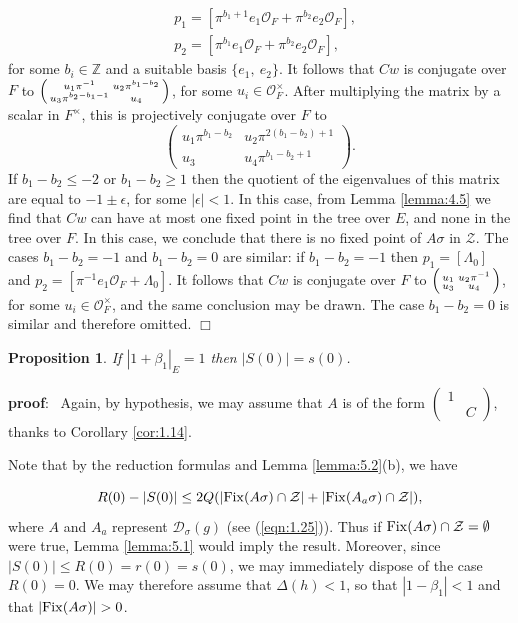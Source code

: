 \documentclass[12pt,letterpaper]{amsart}
\numberwithin{equation}{section}
\newtheorem{proposition}[theorem]{Proposition}
\theoremstyle{definition}
\theoremstyle{plain}
\providecommand{\cal}{\mathcal}
\def\ddd{{\cal D}}
\def\zz{{\cal Z}}
\def\zzz{\mathbb{Z}}
\def\pf{{\bf proof}:\ }
\def\qed{$\Box$}
\def\off{{\cal O}_F}
\begin{document}
\begin{equation}
\begin{split}
&p_1 = [\pi^{b_1+1}e_1\off + \pi^{b_2}e_2\off ],\\
&p_2 = [\pi^{b_1}e_1\off + \pi^{b_2}e_2\off ],
\end{split}
\label{eqn:5.5}
\end{equation}
for some $b_i\in\zzz$ and a suitable basis $\{e_1,\ e_2\}$. It follows that
$Cw$ is conjugate over $F$ to
$\left(\smallmatrix u_1\pi^{-1}&u_2\pi^{b_1-b_2}\\ u_3\pi^{b_2-b_1-1}&
u_4\endsmallmatrix\right)$,
for some $u_i\in \off^{\times}$. After multiplying the matrix by a
scalar in $F^\times$, this is projectively conjugate over $F$ to
\[
\begin{pmatrix}
u_1\pi^{b_1-b_2} &u_2\pi^{2(b_1-b_2)+1}\\
u_3&u_4\pi^{b_1-b_2+1}
\end{pmatrix}.
\]
If $b_1-b_2\leq -2$ or
$b_1-b_2\geq 1$ then the quotient of the eigenvalues
of this matrix are equal to $-1 \pm \epsilon$, for some
$|\epsilon |<1$. 
In this case, from Lemma \ref{lemma:4.5} we find that
$Cw$ can have at most one fixed point in the tree over $E$,
and none in the tree over $F$. In this case,
we conclude that
there is no fixed point of $A\sigma$ in $\zz$. The cases $b_1-b_2=-1$
and $b_1-b_2=0$ are similar: if $b_1-b_2=-1$ then $p_1=[\Lambda_0]$
and $p_2=[\pi^{-1}e_1\off +\Lambda_0]$. It follows that
$Cw$ is conjugate over $F$ to
$\left(\smallmatrix u_1&u_2\pi^{-1}\\ u_3&u_4\endsmallmatrix\right)$,
for some $u_i\in \off^{\times}$, and the same conclusion may be drawn.
The case $b_1-b_2=0$ is similar and therefore omitted.  
\qed

\begin{proposition}
\label{prop:5.6}
If $|1+\beta_1|_E = 1$ then $|S(0)| = s(0)$.
\end{proposition}

\pf 
Again, by hypothesis, we may assume that $A$ is of the form
$\left(\begin{array}{cc}
1&\ \\\ &C\end{array}\right)$, thanks to Corollary
\ref{cor:1.14}.
 
Note that by the reduction formulas and Lemma \ref{lemma:5.2}(b), we have

\begin{equation}
R(0) - |S(0)| \leq 2Q(|{\rm Fix}(A\sigma )\cap \zz |
+|{\rm Fix}(A_a\sigma )\cap \zz |),
\label{eqn:5.7}
\end{equation}
where $A$ and $A_a$ represent $\ddd_\sigma (g)$ (see (\ref{eqn:1.25})). 
Thus if ${\rm Fix}(A\sigma )\cap\zz = \emptyset$ were true, 
Lemma \ref{lemma:5.1}
would imply the result. Moreover, since
$|S(0)| \leq R(0) = r(0) = s(0)$, we may immediately dispose of the
case $R(0) = 0$. We may therefore assume that $\Delta (h) < 1$, so that
$|1-\beta_1|<1$ and that $|{\rm Fix}(A\sigma )|>0$.
 
\end{document}

